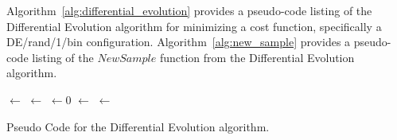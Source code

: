 Algorithm~\ref{alg:differential_evolution} provides a pseudo-code listing of the Differential Evolution algorithm for minimizing a cost function, specifically a DE/rand/1/bin configuration. Algorithm~\ref{alg:new_sample} provides a pseudo-code listing of the $NewSample$ function from the Differential Evolution algorithm.

\begin{algorithm}[htp]
	\SetLine  

	
  
	\KwIn{\PopulationSize, \NumParameters, \WeightingFactor, \CrossoverRate}		
	\KwOut{\Best}
	\Population $\leftarrow$ \InitializePopulation{\PopulationSize, \NumParameters}\;
	\EvaluateCost{\Population}\;
	\Best $\leftarrow$ \GetBestSolution{\Population}\;
	\While{$\neg$\StopCondition{}} {
		\NewPopulation $\leftarrow 0$\;
		\ForEach{\Member $\in$ \Population}{
			\Sample $\leftarrow$ \NewSample{\Member, \Population, \NumParameters, \WeightingFactor, \CrossoverRate}\;
			\eIf{\Cost{\Sample} $\leq$ \Cost{\Member}}{
				\NewPopulation $\leftarrow$ \Sample\;
			}
			{
				\NewPopulation $\leftarrow$ \Member\;
			}
		}
		\Population $\leftarrow$ \NewPopulation\;
		\EvaluateCost{\Population}\;
		\Best $\leftarrow$ \GetBestSolution{\Population}\;
	}
	\Return{\Best}\;
	\caption{Pseudo Code for the Differential Evolution algorithm.}
	\label{alg:differential_evolution}
\end{algorithm}


